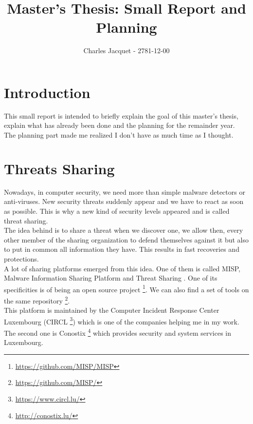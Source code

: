 \documentclass[10pt]{article}
\title{Master's Thesis: Small Report and Planning}
\author{Charles Jacquet - 2781-12-00}
\begin{document}
\maketitle

\section{Introduction}
This small report is intended to briefly explain the goal of this master's thesis, explain what has already been done and the planning for the remainder year.\\
The planning part made me realized I don't have as much time as I thought.\\

\section{Threats Sharing}
Nowadays, in computer security, we need more than simple malware detectors or anti-viruses. New security threats suddenly appear and we have to react as soon as possible. This is why a new kind of security levels appeared and is called threat sharing.\\
The idea behind is to share a threat when we discover one, we allow then, every other member of the sharing organization to defend themselves against it but also to put in common all information they have. This results in fast recoveries and protections.\\

A lot of sharing platforms emerged from this idea. One of them is called MISP, Malware Information Sharing Platform and Threat Sharing \cite{wagner2016misp}. One of its specificities is of being an open source project \footnote{\url{https://github.com/MISP/MISP}}. We can also find a set of tools on the same repository \footnote{\url{https://github.com/MISP/}}. \\
This platform is maintained by the Computer Incident Response Center Luxembourg (CIRCL \footnote{\url{https://www.circl.lu/}}) which is one of the companies helping me in my work. The second one is Conostix \footnote{\url{http://conostix.lu/}} which provides security and system services in Luxembourg.
\end{document}

